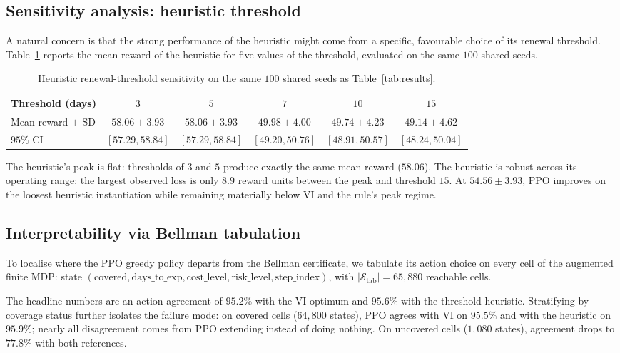 \subsection{Sensitivity analysis: heuristic threshold}
\label{subsec:sensitivity}

A natural concern is that the strong performance of the heuristic might come from a specific, favourable choice of its renewal threshold. Table~\ref{tab:sensitivity} reports the mean reward of the heuristic for five values of the threshold, evaluated on the same $100$ shared seeds.

\begin{table}[h]
\centering
\small
\begin{tabular}{lccccc}
\toprule
Threshold (days) & $3$ & $5$ & $7$ & $10$ & $15$ \\
\midrule
Mean reward $\pm$ SD &
    $58.06 \pm 3.93$ &
    $58.06 \pm 3.93$ &
    $49.98 \pm 4.00$ &
    $49.74 \pm 4.23$ &
    $49.14 \pm 4.62$ \\
$95\%$ CI &
    $[57.29, 58.84]$ &
    $[57.29, 58.84]$ &
    $[49.20, 50.76]$ &
    $[48.91, 50.57]$ &
    $[48.24, 50.04]$ \\
\bottomrule
\end{tabular}
\caption{Heuristic renewal-threshold sensitivity on the same $100$ shared seeds as Table~\ref{tab:results}.}
\label{tab:sensitivity}
\end{table}

The heuristic's peak is flat: thresholds of $3$ and $5$ produce exactly the same mean reward ($58.06$). The heuristic is robust across its operating range: the largest observed loss is only $8.9$ reward units between the peak and threshold $15$. At $54.56 \pm 3.93$, PPO improves on the loosest heuristic instantiation while remaining materially below VI and the rule's peak regime.


\subsection{Interpretability via Bellman tabulation}
\label{subsec:interpretability}

To localise where the PPO greedy policy departs from the Bellman certificate, we tabulate its action choice on every cell of the augmented finite MDP: state $(\mathrm{covered}, \mathrm{days\_to\_exp}, \mathrm{cost\_level}, \mathrm{risk\_level}, \mathrm{step\_index})$, with $|\mathcal{S}_\text{tab}| = 65{,}880$ reachable cells.

The headline numbers are an action-agreement of $95.2\%$ with the VI optimum and $95.6\%$ with the threshold heuristic. Stratifying by coverage status further isolates the failure mode: on covered cells ($64{,}800$ states), PPO agrees with VI on $95.5\%$ and with the heuristic on $95.9\%$; nearly all disagreement comes from PPO extending instead of doing nothing. On uncovered cells ($1{,}080$ states), agreement drops to $77.8\%$ with both references.


